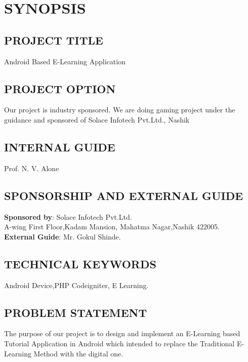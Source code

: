 \documentclass[oneside,a4paper,12pt]{report}
\begin{document}
{\chapter{SYNOPSIS}
\newpage
\section{PROJECT TITLE}
\hspace*{0.3in}Android Based E-Learning Application\\

\section{PROJECT OPTION}
\hspace*{0.3in}Our project is industry sponsored. We are doing gaming project under the guidance and sponsored of Solace Infotech Pvt.Ltd., Nashik\\

\section{INTERNAL GUIDE}
\hspace*{0.3in}Prof. N. V. Alone \\

\section{SPONSORSHIP AND EXTERNAL GUIDE}
\textbf{Sponsored by}: Solace Infotech Pvt.Ltd.\\
A-wing First Floor,Kadam Mansion, Mahatma Nagar,Nashik 422005.\\
\textbf{External Guide}:  Mr. Gokul Shinde.\\

\section{ TECHNICAL KEYWORDS}
\hspace*{0.3in}Android Device,PHP Codeigniter, E Learning.

\section{PROBLEM STATEMENT}
\hspace*{0.3in}The purpose of our project is to design and implement an E-Learning based Tutorial Application in Android which intended to replace the Traditional E- Learning
Method with the digital one.\\

}
\end{document}
